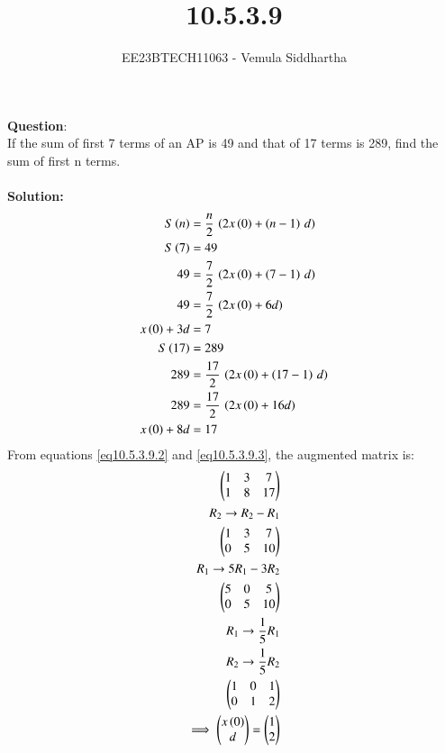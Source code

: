 \documentclass[journal,12pt,twocolumn]{IEEEtran}
\theoremstyle{remark}
\begin{document}

\vspace{3cm}

\title{10.5.3.9}
\author{EE23BTECH11063 - Vemula Siddhartha
}
\maketitle
\newpage
\bigskip

\renewcommand{\thefigure}{\theenumi}
\renewcommand{\thetable}{\theenumi}
\textbf{Question}:\\
If the sum of first 7 terms of an AP is 49 and that of 17 terms is 289, find the sum of
first n terms.
\\\\
\textbf{Solution: }
\begin{align}
S\left(n\right)&=\frac{n}{2}\,\left(2x\left(0\right)+\left(n-1\right)\,d\right)\label{eq10.5.3.9.1}\\
S\left(7\right)&=49 \\
49&=\frac{7}{2}\,\left(2x\left(0\right)+\left(7-1\right)\,d\right)  \\
49&=\frac{7}{2}\,\left(2x\left(0\right)+6d\right)  \\
x\left(0\right)+3d&=7\label{eq10.5.3.9.2}\\
S\left(17\right)&=289  \\
289&=\frac{17}{2}\,\left(2x\left(0\right)+\left(17-1\right)\,d\right)  \\
289&=\frac{17}{2}\,\left(2x\left(0\right)+16d\right)  \\
x\left(0\right)+8d&=17 \label{eq10.5.3.9.3}
\end{align}
From  equations \ref{eq10.5.3.9.2} and \ref{eq10.5.3.9.3}, the augmented matrix is:
\begin{align}\vspace{3cm}
 \begin{pmatrix}
1&3&7\\
1&8&17
 \end{pmatrix}
 \\
 R_2\rightarrow R_2-R_1\notag\\
 \begin{pmatrix}
    1&3&7\\
    0&5&10
 \end{pmatrix}
 \\
 R_1\rightarrow 5R_1-3R_2\notag\\
 \begin{pmatrix}
    5&0&5\\
    0&5&10
 \end{pmatrix}
 \\
 R_1\rightarrow\frac{1}{5}R_1\notag\\ R_2\rightarrow\frac{1}{5}R_2\notag\\
 \begin{pmatrix}
    1&0&1\\
    0&1&2
 \end{pmatrix}\\
 \implies
 \begin{pmatrix}
    x\brak{0}\\
    d
 \end{pmatrix}
 =
 \begin{pmatrix}
    1\\2
 \end{pmatrix}
\end{align}
\end{document}

